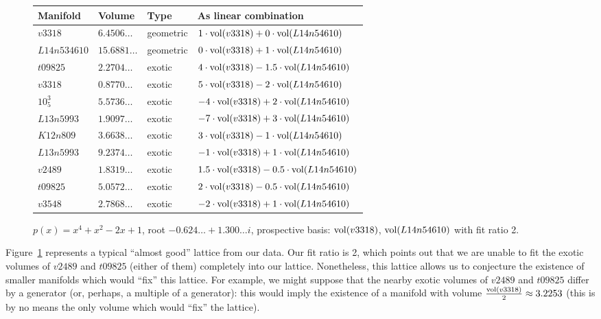 \documentclass[10pt]{amsart}
\numberwithin{equation}{theorem}
\theoremstyle{definition}
\begin{document}
\begin{figure}[h]
  \begin{tabular}{llll} \hline
    Manifold & Volume & Type & As linear combination \\ \hline
    $v3318$ & $6.4506\dotsc$ & geometric & $1\cdot\operatorname{vol}(v3318)+0\cdot\operatorname{vol}(L14n54610)$ \\
    $L14n534610$ & $15.6881\dotsc$ & geometric & $0\cdot\operatorname{vol}(v3318)+1\cdot\operatorname{vol}(L14n54610)$ \\
    $t09825$ & $2.2704\dotsc$ & exotic & $4\cdot\operatorname{vol}(v3318)-1.5\cdot\operatorname{vol}(L14n54610)$ \\
    $v3318$ & $0.8770\dotsc$ & exotic & $5\cdot\operatorname{vol}(v3318)-2\cdot\operatorname{vol}(L14n54610)$ \\
    $10^{3}_{5}$ & $5.5736\dotsc$ & exotic & $-4\cdot\operatorname{vol}(v3318)+2\cdot\operatorname{vol}(L14n54610)$ \\
    $L13n5993$ & $1.9097\dotsc$ & exotic & $-7\cdot\operatorname{vol}(v3318)+3\cdot\operatorname{vol}(L14n54610)$ \\
    $K12n809$ & $3.6638\dotsc$ & exotic & $3\cdot\operatorname{vol}(v3318)-1\cdot\operatorname{vol}(L14n54610)$ \\
    $L13n5993$ & $9.2374\dotsc$ & exotic & $-1\cdot\operatorname{vol}(v3318)+1\cdot\operatorname{vol}(L14n54610)$ \\
    $v2489$ & $1.8319\dotsc$ & exotic & $1.5\cdot\operatorname{vol}(v3318)-0.5\cdot\operatorname{vol}(L14n54610)$ \\
    $t09825$ & $5.0572\dotsc$ & exotic & $2\cdot\operatorname{vol}(v3318)-0.5\cdot\operatorname{vol}(L14n54610)$ \\
    $v3548$ & $2.7868\dotsc$ & exotic & $-2\cdot\operatorname{vol}(v3318)+1\cdot\operatorname{vol}(L14n54610)$ \\
  \end{tabular}
  \caption{$p(x) = x^4+x^2-2x+1$, root $-0.624\dotsc+1.300\dotsc i$,
  prospective basis: $\operatorname{vol}(v3318)$, $\operatorname{vol}(L14n54610)$ with fit ratio 2.}
  \label{fig:v3318-lattice}
\end{figure}

Figure~\ref{fig:v3318-lattice} represents a typical ``almost good''
lattice from our data.  Our fit ratio is 2, which points out that we
are unable to fit the exotic volumes of $v2489$ and $t09825$ (either
of them) completely into our lattice. Nonetheless, this lattice allows
us to conjecture the existence of smaller manifolds which would
``fix'' this lattice. For example, we might suppose that the nearby
exotic volumes of $v2489$ and $t09825$ differ by a generator (or,
perhaps, a multiple of a generator): this would imply the existence of
a manifold with volume $\frac{\operatorname{vol}(v3318)}{2} \approx 3.2253$ (this is
by no means the only volume which would ``fix'' the lattice).

\clearpage

\printbibliography
\end{document}

